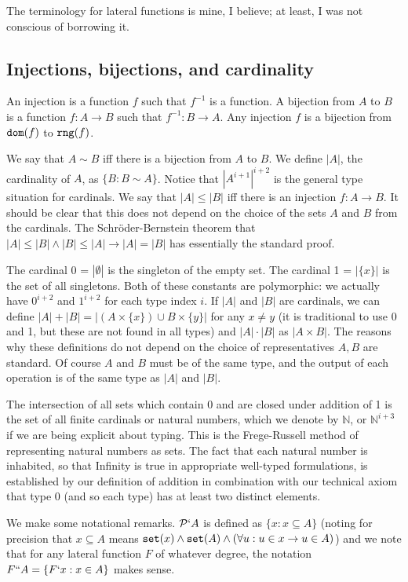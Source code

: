 \documentclass[12pt]{article}
\begin{document}
The terminology for lateral functions is mine, I believe;  at least, I was not conscious of borrowing it.

\subsection{Injections, bijections, and cardinality}

An injection is a function $f$ such that $f^{-1}$ is a function.  A bijection from $A$ to $B$  is a function $f:A \rightarrow B$ such that $f^{-1}:B \rightarrow A$.  Any injection $f$ is
a bijection from ${\tt dom}(f)$ to ${\tt rng}(f)$.

We say that $A \sim B$ iff there is a bijection from $A$ to $B$.  We define $|A|$, the cardinality of $A$, as $\{B : B \sim A\}$.  Notice that $|A^{i+1}|^{i+2}$ is the general type situation for cardinals.  We say that $|A| \leq |B|$ iff there is an injection $f:A \rightarrow B$.  It should be clear that this does not depend on the choice of the sets $A$ and $B$ from the cardinals.
The Schr\"oder-Bernstein theorem that $|A| \leq |B| \wedge |B| \leq |A| \rightarrow |A|=|B|$ has essentially the standard proof.

The cardinal 0 = $|\emptyset|$ is the singleton of the empty set.  The cardinal 1 = $|\{x\}|$ is the set of all singletons.  Both of these constants are polymorphic:  we actually have $0^{i+2}$ and $1^{i+2}$ for each type index $i$.  If $|A|$ and $|B|$ are cardinals, we can define
$|A|+|B| = |(A \times \{x\}) \cup B \times \{y\}|$ for any $x \neq y$ (it is traditional to use 0 and 1, but these are not found in all types) and $|A| \cdot |B|$ as $|A \times B|$.  The reasons why these definitions do not depend on the choice of representatives $A,B$ are standard.  Of course $A$ and $B$ must be of the same type, and the output of each operation is of the same type as $|A|$ and $|B|$.

The intersection of all sets which contain 0 and are closed under addition of 1 is the set of all finite cardinals or natural numbers, which we denote by $\mathbb N$, or $\mathbb N^{i+3}$ if we are being explicit about typing.  This is the Frege-Russell method of representing natural numbers as sets.  The fact that each natural number is inhabited, so that Infinity is true in appropriate well-typed formulations, is established by our definition of addition in combination with our technical axiom that type 0 (and so each type) has at least two distinct elements.

We make some notational remarks.  ${\cal P}`A$ is defined as $\{x:x \subseteq A\}$ (noting for precision that $x \subseteq A$ means ${\tt set}(x) \wedge {\tt set}(A) \wedge (\forall u:u \in x \rightarrow u \in A)$) and we note that for any lateral function $F$ of whatever degree, the notation $F``A = \{F`x:x \in A\}$ makes sense.
\end{document}
